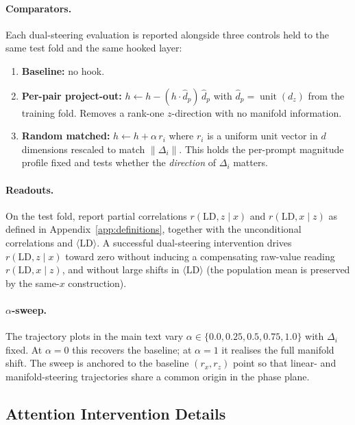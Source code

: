\documentclass{article}
\newcommand{\primalz}{\ensuremath{d_{z}}}
\begin{document}
\paragraph{Comparators.}
Each dual-steering evaluation is reported alongside three controls held to the same test fold and the same hooked layer:
\begin{enumerate}
\item \textbf{Baseline:} no hook.
\item \textbf{Per-pair project-out:}
$h\leftarrow h-(h\cdot\hat d_p)\,\hat d_p$ with
$\hat d_p=\operatorname{unit}(\primalz)$ from the training fold. Removes a
rank-one $z$-direction with no manifold information.
\item \textbf{Random matched:} $h\leftarrow h+\alpha\,r_i$ where $r_i$ is a uniform unit vector in $d$ dimensions rescaled to match $\|\Delta_i\|$.
This holds the per-prompt magnitude profile fixed and tests whether the \emph{direction} of $\Delta_i$ matters.
\end{enumerate}

\paragraph{Readouts.}
On the test fold, report partial correlations $r(\mathrm{LD},z\mid x)$ and $r(\mathrm{LD},x\mid z)$ as defined in Appendix~\ref{app:definitions}, together with the unconditional correlations and $\langle\mathrm{LD}\rangle$. A successful dual-steering intervention drives $r(\mathrm{LD},z\mid x)$ toward zero without inducing a compensating raw-value reading $r(\mathrm{LD},x\mid z)$, and without large shifts in $\langle\mathrm{LD}\rangle$ (the population mean is preserved by the same-$x$ construction).

\paragraph{$\alpha$-sweep.}
The trajectory plots in the main text vary $\alpha\in\{0.0, 0.25, 0.5, 0.75, 1.0\}$ with $\Delta_i$ fixed. At $\alpha=0$ this recovers the baseline; at $\alpha=1$ it realises the full manifold shift. The sweep is anchored to the baseline $(r_x,r_z)$ point so that linear- and manifold-steering trajectories share a common origin in the phase plane.


\subsection{Attention Intervention Details}
\label{app:attention-details}
\end{document}
